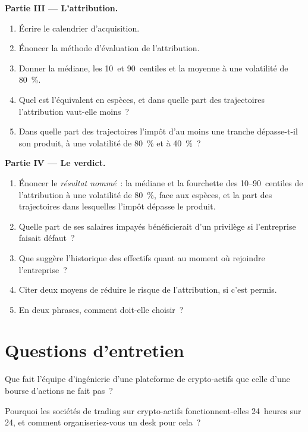\begin{problem}
\medskip\noindent\textbf{Partie III --- L'attribution.}
\begin{enumerate}[resume]
\item Écrire le calendrier d'acquisition.
\item Énoncer la méthode d'évaluation de l'attribution.
\item Donner la médiane, les 10~et 90~centiles et la moyenne à une volatilité de 80~\%.
\item Quel est l'équivalent en espèces, et dans quelle part des trajectoires l'attribution vaut-elle moins~?
\item Dans quelle part des trajectoires l'impôt d'au moins une tranche dépasse-t-il son produit, à une volatilité de 80~\% et à 40~\%~?
\end{enumerate}

\medskip\noindent\textbf{Partie IV --- Le verdict.}
\begin{enumerate}[resume]
\item Énoncer le \emph{résultat nommé}~: la médiane et la fourchette des 10--90~centiles de l'attribution à une volatilité de 80~\%,
face aux espèces, et la part des trajectoires dans lesquelles l'impôt dépasse le produit.
\item Quelle part de ses salaires impayés bénéficierait d'un privilège si l'entreprise faisait défaut~?
\item Que suggère l'historique des effectifs quant au moment où rejoindre l'entreprise~?
\item Citer deux moyens de réduire le risque de l'attribution, si c'est permis.
\item En deux phrases, comment doit-elle choisir~?
\end{enumerate}
\end{problem}

\section{Questions d'entretien}

\begin{interviewq}\label{iq:in:crypto-native-firms:1}
Que fait l'équipe d'ingénierie d'une plateforme de crypto-actifs que celle d'une bourse d'actions ne fait pas~?
\end{interviewq}

\begin{interviewq}\label{iq:in:crypto-native-firms:2}
Pourquoi les sociétés de trading sur crypto-actifs fonctionnent-elles 24~heures sur 24, et comment organiseriez-vous un desk pour cela~?
\end{interviewq}

